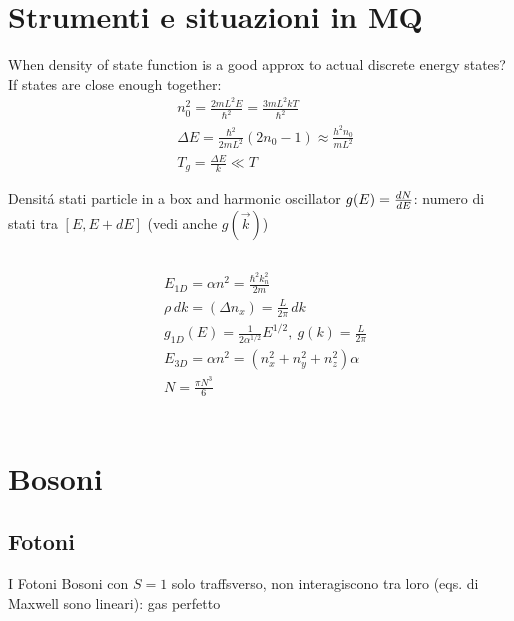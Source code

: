 \section{Strumenti e situazioni in MQ}

\begin{frame}{When density of state function is a good approx to actual discrete energy states?}
If states are close enough together:
\begin{align*}
    &n_0^2=\frac{2mL^2E}{\hbar^2}=\frac{3mL^2kT}{\hbar^2}\tag{Def $n_0$ from thermal energy}\\
    &\Delta E=\frac{\hbar^2}{2mL^2}(2n_0-1)\approx\frac{h^2n_0}{mL^2}\tag{energy level separation}\\
    &T_g=\frac{\Delta E}{k}\ll T
\end{align*}
\end{frame}

\begin{frame}{Densit\'a stati particle in a box and harmonic oscillator}
    $g(E)=\TDy{E}{N}$: numero di stati tra $[E,E+dE]$ (vedi anche $g(\vec{k})$)
\begin{columns}[T]
 \begin{column}{0.5\textwidth}
\begin{align*}
    &E_{1D}=\alpha n^2=\frac{\hbar^2k_n^2}{2m}\\
    &\rho\,dk=(\Delta n_x)=\frac{L}{2\pi}\,dk\\
    &g_{1D}(E)=\frac{1}{2\alpha^{1/2}}E^{1/2},\ g(k)=\frac{L}{2\pi}\\
    &E_{3D}=\alpha n^2=(n_x^2+n_y^2+n_z^2)\alpha\\
    &N=\frac{\pi N^3}{6}\\
\end{align*}
 \end{column}
 \end{columns}
\end{frame}

\section{Bosoni}

\subsection{Fotoni}

\begin{frame}{I Fotoni}
Bosoni con $S=1$ solo traffsverso, non interagiscono tra loro (eqs. di Maxwell sono lineari): gas perfetto
\end{frame}

